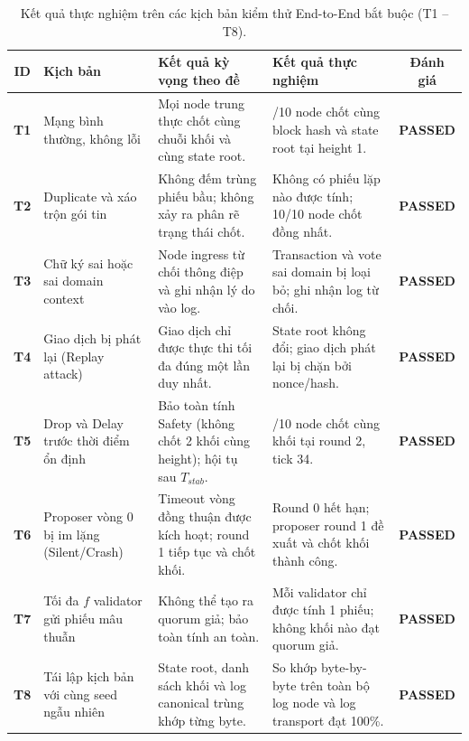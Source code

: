 \documentclass[10pt,a4paper]{report}
\begin{document}
\begin{table}[H]
\centering
\small
\renewcommand{\arraystretch}{1.25}
\begin{tabularx}{\textwidth}{|c|>{\raggedright\arraybackslash}p{3.2cm}|>{\raggedright\arraybackslash}X|>{\centering\arraybackslash}p{2.2cm}|c|}
\hline
\textbf{ID} & \textbf{Kịch bản} & \textbf{Kết quả kỳ vọng theo đề} & \textbf{Kết quả thực nghiệm} & \textbf{Đánh giá} \\
\hline
\textbf{T1} & Mạng bình thường, không lỗi & Mọi node trung thực chốt cùng chuỗi khối và cùng state root. & 10/10 node chốt cùng block hash và state root tại height 1. & \textbf{PASSED} \\
\hline
\textbf{T2} & Duplicate và xáo trộn gói tin & Không đếm trùng phiếu bầu; không xảy ra phân rẽ trạng thái chốt. & Không có phiếu lặp nào được tính; 10/10 node chốt đồng nhất. & \textbf{PASSED} \\
\hline
\textbf{T3} & Chữ ký sai hoặc sai domain context & Node ingress từ chối thông điệp và ghi nhận lý do vào log. & Transaction và vote sai domain bị loại bỏ; ghi nhận log từ chối. & \textbf{PASSED} \\
\hline
\textbf{T4} & Giao dịch bị phát lại (Replay attack) & Giao dịch chỉ được thực thi tối đa đúng một lần duy nhất. & State root không đổi; giao dịch phát lại bị chặn bởi nonce/hash. & \textbf{PASSED} \\
\hline
\textbf{T5} & Drop và Delay trước thời điểm ổn định & Bảo toàn tính Safety (không chốt 2 khối cùng height); hội tụ sau $T_{stab}$. & 10/10 node chốt cùng khối tại round 2, tick 34. & \textbf{PASSED} \\
\hline
\textbf{T6} & Proposer vòng 0 bị im lặng (Silent/Crash) & Timeout vòng đồng thuận được kích hoạt; round 1 tiếp tục và chốt khối. & Round 0 hết hạn; proposer round 1 đề xuất và chốt khối thành công. & \textbf{PASSED} \\
\hline
\textbf{T7} & Tối đa $f$ validator gửi phiếu mâu thuẫn & Không thể tạo ra quorum giả; bảo toàn tính an toàn. & Mỗi validator chỉ được tính 1 phiếu; không khối nào đạt quorum giả. & \textbf{PASSED} \\
\hline
\textbf{T8} & Tái lập kịch bản với cùng seed ngẫu nhiên & State root, danh sách khối và log canonical trùng khớp từng byte. & So khớp byte-by-byte trên toàn bộ log node và log transport đạt 100\%. & \textbf{PASSED} \\
\hline
\end{tabularx}
\caption{Kết quả thực nghiệm trên các kịch bản kiểm thử End-to-End bắt buộc (T1 -- T8).}
\label{tab:e2e-results}
\end{table}
\end{document}

